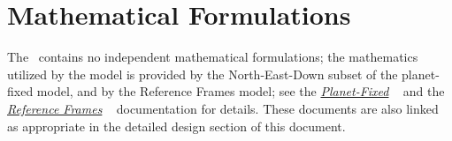 %
%
% 
%

\section{Mathematical Formulations}

The \NEDDesc\ contains no independent mathematical formulations; the mathematics utilized by the model is provided by the North-East-Down subset of the planet-fixed model, and by the Reference Frames model;  see the \href{file:\JEODHOME/models/utils/planet_fixed/docs/planet_fixed.pdf}{\em Planet-Fixed} ~\cite{dynenv:PLANETFIXED} and the \href{file:\JEODHOME/models/utils/ref\_frames/docs/ref\_frames.pdf}{\em Reference Frames} ~\cite{dynenv:REFFRAMES} documentation for details.  These documents are also linked as appropriate in the detailed design section of this document.

